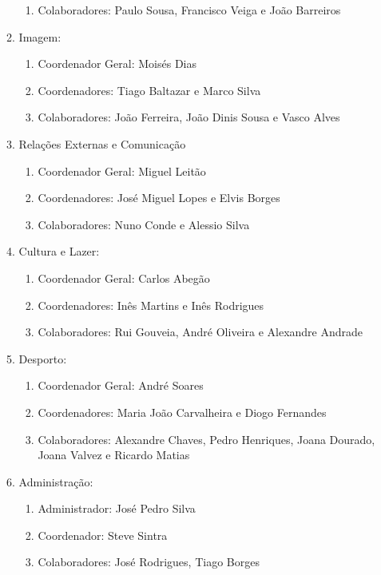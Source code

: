 \begin{enumerate}
\begin{enumerate}
\begin{enumerate}
    \item Colaboradores: Paulo Sousa, Francisco Veiga e João Barreiros
    \end{enumerate}
  \item Imagem:
    \begin{enumerate}
    \item Coordenador Geral: Moisés Dias
    \item Coordenadores: Tiago Baltazar e Marco Silva
    \item Colaboradores: João Ferreira, João Dinis Sousa e Vasco Alves
    \end{enumerate}
  \item Relações Externas e Comunicação
    \begin{enumerate}
    \item Coordenador Geral: Miguel Leitão
    \item Coordenadores: José Miguel Lopes e Elvis Borges
    \item Colaboradores: Nuno Conde e Alessio Silva
    \end{enumerate}
  \item Cultura e Lazer:
    \begin{enumerate}
    \item Coordenador Geral: Carlos Abegão
    \item Coordenadores: Inês Martins e Inês Rodrigues
    \item Colaboradores: Rui Gouveia, André Oliveira e Alexandre Andrade
    \end{enumerate}
  \item Desporto:
    \begin{enumerate}
    \item Coordenador Geral: André Soares
    \item Coordenadores: Maria João Carvalheira e Diogo Fernandes
    \item Colaboradores: Alexandre Chaves, Pedro Henriques, Joana Dourado, Joana Valvez e Ricardo Matias
    \end{enumerate}
  \item Administração:
    \begin{enumerate}
    \item Administrador: José Pedro Silva
    \item Coordenador: Steve Sintra
    \item Colaboradores: José Rodrigues, Tiago Borges
    \end{enumerate}
  \end{enumerate}
\end{enumerate}

